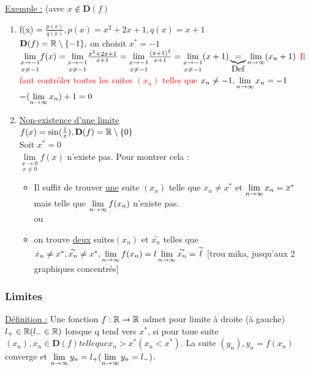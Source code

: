 \documentclass[12pt,a4paper]{article}
\begin{document}
{\underline{Exemple :} (avec $x \not \in \mathbf{D}(f)$
\begin{enumerate}
\item f(x) = $\frac{p(x)}{q(x)}, p(x) = x^2+2x+1, q(x) = x+1$\\
$\mathbf{D}(f) = \mathbb{R} \setminus \{-1\},$ on choisit $x^* = -1$\\
$\underset{x \neq -1}{\lim\limits_{x \to -1}} f(x) = \underset{x \neq -1}{\lim\limits_{x \to -1}} \frac{x^2+2x+1}{x+1} = \underset{x \neq -1}{\lim\limits_{x \to -1}} \frac{(x+1)^2}{x+1} = \underset{x \neq -1}{\lim\limits_{x \to -1}} (x+1) \underbrace{=}_{\mbox{Def}} \lim\limits_{n \to \infty} (x_n+1)$ \textcolor{red}{Il faut contrôler toutes les suites $(x_n)$ telles que $x_n \neq -1,\lim\limits_{n \to \infty} x_n = -1$}\\
=$(\lim\limits_{n \to \infty} x_n) +1 = 0$
\item \underline{Non-existence d'une limite}\\
$f(x) = \sin(\frac{1}{x}), \mathbf{D}(f) = \mathbb{R}\setminus\{0\}$\\
Soit $x^* = 0$\\
$\underset{x \neq 0}{\lim\limits_{x \to 0}} f(x)$ n'existe pas. Pour montrer cela :
\begin{itemize}
\item Il suffit de trouver \underline{une} suite $(x_n)$ telle que $x_n \neq x^*$ et $ \lim\limits_{n \to \infty} x_n = x^*$ mais telle que $\lim\limits_{n \to \infty}f(x_n)$ n'existe pas.\\
ou
\item  on trouve \underline{deux} suites$(x_n)$ et $\overset{\sim}{x_n}$ telles que $x_n \neq x^*, \overset{\sim}{x_n} \neq x^*, \lim\limits_{n \to \infty} f(x_n) = l \lim\limits_{n \to \infty} \overset{\sim}{x_n} = \overset{\sim}{l}$
[trou mika, jusqu'aux 2 graphiques concentrés]
\end{itemize}
\end{enumerate}
\subsubsection{Limites}


\begin{boite}
\underline{Définition :} Une fonction $f: \mathbb{R} \to \mathbb{R}$ admet pour limite à droite (à gauche) $l_+ \in \mathbb{R} (l_- \in \mathbb{R})$ lorsque q tend vers $x^*$, si pour toue suite $(x_n), x_n \in \mathbf{D}(f) telle que x_n > x^* (x_n < x^*)$. La suite $(y_n), y_n = f(x_n)$ converge et $\lim\limits_{n \to \infty} y_n = l_+ (\lim\limits_{n \to \infty} y_n = l_-)$.
\end{boite}

}
\end{document}
